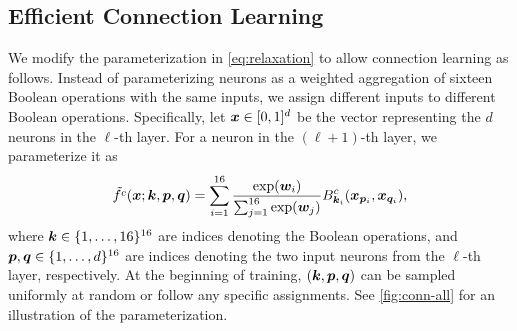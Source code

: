\subsection{Efficient Connection Learning} \label{sec:learning_connectivity}
We modify the parameterization in \cref{eq:relaxation} 
to allow connection learning as follows. Instead of 
parameterizing neurons as a weighted aggregation 
of sixteen Boolean operations with the same inputs, 
we assign different inputs to different Boolean operations.
Specifically, 
let ${\bm{x}} \in [0,1]^d$ be the vector representing the $d$ neurons in the $\ell$-th layer. 
For a neuron in the $(\ell+1)$-th layer, we parameterize it as  
\begin{equation} %
  \tilde{f^c}(\vx; \vk, \vp, \vq) = \sum_{i=1}^{16} \frac{\exp(\vw_i)}{\sum_{j=1}^{16} \exp(\vw_j)} B_{\vk_i}^c(\vx_{\vp_i}, \vx_{\vq_i}),
\end{equation}
where ${\bm{k}} \in \{1, \dots, 16\}^{16}$ are indices denoting the Boolean operations, and ${\bm{p}}, {\bm{q}} \in \{1,\dots, d\}^{16}$
are indices denoting the two input neurons from the $\ell$-th layer, respectively.
At the beginning of training, $({\bm{k}}, {\bm{p}}, {\bm{q}})$ can be sampled uniformly at random or follow any specific assignments. See \cref{fig:conn-all} for an illustration of the  parameterization. 


